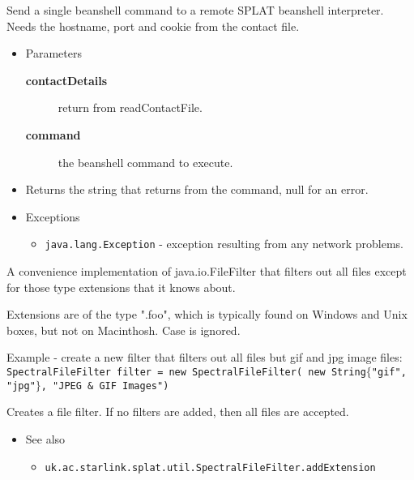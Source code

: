 \begin{desc}Send a single beanshell command to a remote SPLAT beanshell
 interpreter. Needs the hostname, port and cookie from the
 contact file.
\begin{itemize}
\item{Parameters
  \begin{description}
   \item[\textbf{contactDetails}]{return from readContactFile.}
   \item[\textbf{command}]{the beanshell command to execute.}
  \end{description}}
\end{itemize}
\begin{itemize}
\item{Returns the string that returns from the command, null for an error. }
\item{{Exceptions}
  \begin{itemize}
   \item{\vspace{-.6ex}\texttt{java.lang.Exception} - exception resulting from any network problems.}
  \end{itemize}
}
\end{itemize}
\end{desc}





\vspace{.09in}


{A convenience implementation of java.io.FileFilter that filters out
 all files except for those type extensions that it knows about.
 
 Extensions are of the type ".foo", which is typically found on
 Windows and Unix boxes, but not on Macinthosh. Case is ignored.
 
 Example - create a new filter that filters out all files
 but gif and jpg image files:
 \texttt{
\mbox{}\newline
    SpectralFileFilter filter = new SpectralFileFilter(\mbox{}\newline
                   new String$\{$"gif", "jpg"$\}$, "JPEG \& GIF Images")\mbox{}\newline
 }
}
\constructors
{}
\begin{desc}Creates a file filter. If no filters are added, then all
 files are accepted.
\begin{itemize}
\item{{See also}
  \begin{itemize}
   \item{\texttt{uk.ac.starlink.splat.util.SpectralFileFilter.addExtension} {
}
}
  \end{itemize}
}
\end{itemize}
\end{desc}

